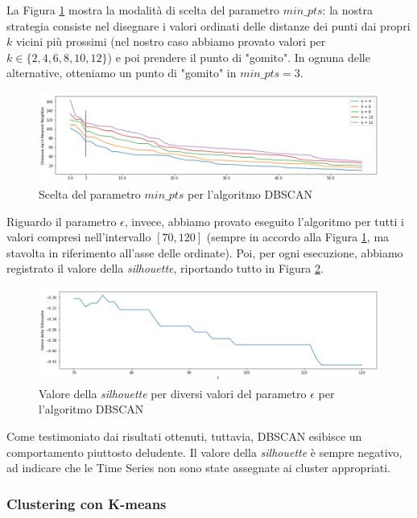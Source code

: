 \documentclass[a4paper]{article}
\begin{document}
La Figura \ref{fig:choice_minpts} mostra la modalità di scelta del parametro $min\_pts$: la nostra strategia consiste nel disegnare i valori ordinati delle distanze dei punti dai propri $k$ vicini più prossimi (nel nostro caso abbiamo provato valori per $k \in \{2,4,6,8,10,12\}$) e poi prendere il punto di "gomito". In ognuna delle alternative, otteniamo un punto di "gomito" in $min\_pts=3$.

\begin{figure}[h]
	\includegraphics[width=\textwidth]{images/choice_of_minpts.png}
	\caption{Scelta del parametro $min\_pts$ per l'algoritmo DBSCAN}
	\label{fig:choice_minpts}
\end{figure}

Riguardo il parametro $\epsilon$, invece, abbiamo provato eseguito l'algoritmo per tutti i valori compresi nell'intervallo $[70,120]$ (sempre in accordo alla Figura \ref{fig:choice_minpts}, ma stavolta in riferimento all'asse delle ordinate). Poi, per ogni esecuzione, abbiamo registrato il valore della \textit{silhouette}, riportando tutto in Figura \ref{fig:silhouette_vs_epsilon}.

\begin{figure}[h]
	\includegraphics[width=\textwidth]{images/silhouette_vs_epsilon.png}
	\caption{Valore della \textit{silhouette} per diversi valori del parametro $\epsilon$ per l'algoritmo DBSCAN}
	\label{fig:silhouette_vs_epsilon}
\end{figure}

Come testimoniato dai risultati ottenuti, tuttavia, DBSCAN esibisce un comportamento piuttosto deludente. Il valore della \textit{silhouette} è sempre negativo, ad indicare che le Time Series non sono state assegnate ai cluster appropriati.

\subsubsection{Clustering con K-means}
\end{document}
